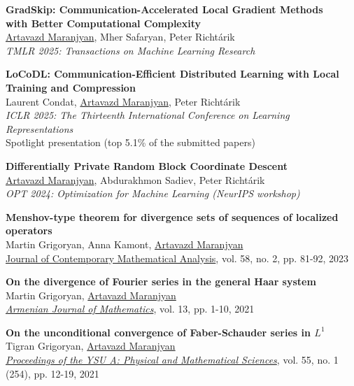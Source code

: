 \documentclass[10pt,a4paper,sans]{moderncv}        %
\newcommand{\red}{\color{cherry}}
\newcommand{\highlight}[1]{{\red #1}}
\begin{document}
\begin{etaremune}
\item \textbf{GradSkip: Communication-Accelerated Local Gradient Methods \\ with Better Computational Complexity}\\
\underline{Artavazd Maranjyan}, Mher Safaryan, Peter Richtárik\\
\textit{TMLR 2025: Transactions on Machine Learning Research}

\item \textbf{LoCoDL: Communication-Efficient Distributed Learning with Local Training and Compression}\\
Laurent Condat, \underline{Artavazd Maranjyan}, Peter Richtárik\\
\textit{ICLR 2025: The Thirteenth International Conference on Learning Representations}\\
\highlight{Spotlight presentation (top 5.1\% of the submitted papers)}

\item \textbf{Differentially Private Random Block Coordinate Descent}\\
\underline{Artavazd Maranjyan}, Abdurakhmon Sadiev, Peter Richtárik\\
\textit{OPT 2024: Optimization for Machine Learning (NeurIPS workshop)}

\item \textbf{Menshov-type theorem for divergence sets of sequences of localized operators}\\
Martin Grigoryan, Anna Kamont, \underline{Artavazd Maranjyan}\\
\href{https://doi.org/10.3103/S106836232302005X}{Journal of Contemporary Mathematical Analysis}, vol. 58, no. 2, pp. 81-92, 2023

\item \textbf{On the divergence of Fourier series in the general Haar system}\\
Martin Grigoryan, \underline{Artavazd Maranjyan}\\ \textcolor{accent}{\href{https://doi.org/10.52737/18291163-2021.13.6-1-10}{\textit{Armenian Journal of Mathematics}}}, vol. 13, pp. 1-10, 2021

\item \textbf{On the unconditional convergence of Faber-Schauder series in $L^1$}\\
Tigran Grigoryan, \underline{Artavazd Maranjyan}\\
\textcolor{accent}{\href{http://www.old.ysu.am/files/vol55\_no1\_2021\_pp12\%E2\%80\%9319.pdf}{\textit{Proceedings of the YSU A: Physical and Mathematical Sciences}}}, vol. 55, no. 1 (254), pp. 12-19, 2021
\end{etaremune}
\end{document}
